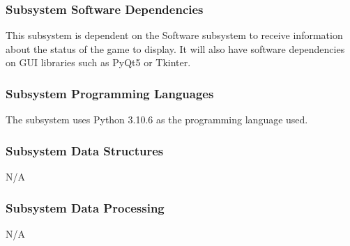 
\subsubsection{Subsystem Software Dependencies}
This subsystem is dependent on the Software subsystem to receive information about the status of the game to display. It will also have software dependencies on GUI libraries such as PyQt5 or Tkinter.

\subsubsection{Subsystem Programming Languages}
The subsystem uses Python 3.10.6 as the programming language used.

\subsubsection{Subsystem Data Structures}
N/A

\subsubsection{Subsystem Data Processing}
N/A



